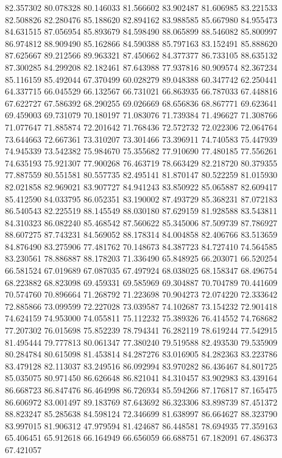 82.357302
80.078328
80.146033
81.566602
83.902487
81.606985
83.221533
82.508826
82.280476
85.188620
82.894162
83.988585
85.667980
84.955473
84.631515
87.056954
85.893679
84.598490
88.065899
88.546082
85.800997
86.974812
88.909490
85.162866
84.590388
85.797163
83.152491
85.888620
87.625667
89.212566
89.963321
87.450662
84.377377
86.733105
88.635132
87.300285
84.299208
82.182461
87.643988
77.937816
80.909574
82.367234
85.116159
85.492044
67.370499
60.028279
89.048388
60.347742
62.250441
64.337715
66.045529
66.132567
66.731021
66.863935
66.787033
67.448816
67.622727
67.586392
68.290255
69.026669
68.656836
68.867771
69.623641
69.459003
69.731079
70.180197
71.083076
71.739384
71.496627
71.308766
71.077647
71.885874
72.201642
71.768436
72.572732
72.022306
72.064764
73.644663
72.667361
73.310207
73.301466
73.396911
74.740583
75.447939
74.945339
73.542382
75.984670
75.355682
77.910690
77.480185
77.556261
74.635193
75.921307
77.900268
76.463719
78.663429
82.218720
80.379355
77.887559
80.551581
80.557735
82.495141
81.870147
80.522259
81.015930
82.021858
82.969021
83.907727
84.941243
83.850922
85.065887
82.609417
85.412590
84.033795
86.052351
83.190002
87.493729
85.368231
87.072183
86.540543
82.225519
88.145549
88.030180
87.629159
81.928588
83.543811
84.310323
86.082240
85.468542
87.560622
85.345006
87.509739
87.786927
88.607275
87.743231
84.569052
88.178314
84.004858
82.406766
83.513659
84.876490
83.275906
77.481762
70.148673
84.387723
84.727410
74.564585
83.230561
78.886887
88.178203
71.336490
65.848925
66.203071
66.520254
66.581524
67.019689
67.087035
67.497924
68.038025
68.158347
68.496754
68.223882
68.823098
69.459331
69.585969
69.304887
70.704789
70.441609
70.574760
70.896664
71.268792
71.223698
70.904273
72.074220
72.333642
72.885866
73.099599
72.227028
73.039587
74.102687
73.154232
72.901418
74.624159
74.953000
74.055811
75.112232
75.389326
76.414552
74.768682
77.207302
76.015698
75.852239
78.794341
76.282119
78.619244
77.542915
81.495444
79.777813
80.061347
77.380240
79.519588
82.493530
79.535909
80.284784
80.615098
81.453814
84.287276
83.016905
84.282363
83.223786
83.479128
82.113037
83.249516
86.092994
83.970282
86.436467
84.801725
85.035075
80.971450
86.626648
86.821041
84.310457
83.902983
83.439164
86.668723
86.847476
86.464998
86.726934
85.594266
87.176817
87.165475
86.606972
83.001497
89.183769
87.643692
86.323306
83.898739
87.451372
88.823247
85.285638
84.598124
72.346699
81.638997
86.664627
88.323790
83.997015
81.906312
47.979594
81.424687
86.448581
78.694935
77.359163
65.406451
65.912618
66.164949
66.656059
66.688751
67.182091
67.486373
67.421057
